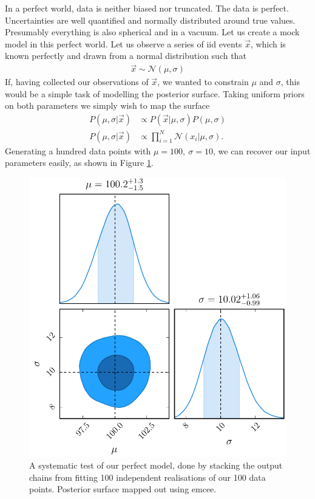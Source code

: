 \documentclass[a4paper,fleqn,usenatbib]{mnras}
\begin{document}
In a perfect world, data is neither biased nor truncated. The data is perfect. Uncertainties are well quantified and normally distributed around true values. Presumably everything is also spherical and in a vacuum. Let us create a mock model in this perfect world. Let us observe a series of iid events $\vec{x}$, which is known perfectly and drawn from a normal distribution such that 
\begin{align}
\vec{x} \sim \mathcal{N}(\mu,\sigma)
\end{align}
If, having collected our observations of $\vec{x}$, we wanted to constrain $\mu$ and $\sigma$, this would be a simple task of modelling the posterior surface. Taking uniform priors on both parameters we simply wish to map the surface
\begin{align}
P(\mu,\sigma| \vec{x}) &\propto P(\vec{x} | \mu, \sigma) P(\mu, \sigma) \\
P(\mu,\sigma| \vec{x}) &\propto \prod_{i=1}^N \mathcal{N}(x_i | \mu, \sigma).
\end{align}
Generating a hundred data points with $\mu=100,\ \sigma=10$, we can recover our input parameters easily, as shown in Figure \ref{fig:perfect}.
\begin{figure}
	\begin{center}
		\includegraphics[width=\columnwidth]{example/perfect.pdf}
	\end{center}
	\caption{A systematic test of our perfect model, done by stacking the output chains from fitting 100 independent realisations of our 100 data points. Posterior surface mapped out using emcee.}
	\label{fig:perfect}
\end{figure}
\end{document}

